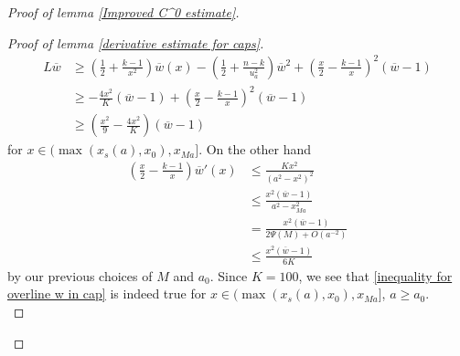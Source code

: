 \documentclass[pdflatex,sn-mathphys-num]{sn-jnl}
\begin{document}
\begin{proof}[Proof of lemma \ref{Improved C^0 estimate}]
\begin{proof}[Proof of lemma \ref{derivative estimate for caps}]
\begin{align*}
    L\overline{w} &\geq (\frac{1}{2} + \frac{k-1}{x^2})\overline{w}(x) - (\frac{1}{2} + \frac{n-k}{u_a^2})\overline{w}^2 + (\frac{x}{2} - \frac{k-1}{x})^2(\overline{w}-1)\\ &\geq -\frac{4x^2}{K}(\overline{w}-1) + (\frac{x}{2} - \frac{k-1}{x})^2(\overline{w} - 1) \\ & \geq (\frac{x^2}{9} - \frac{4x^2}{K})(\overline{w} - 1)
\end{align*}
for $x \in (\max(x_{s}(a), x_0), x_{Ma}]$. On the other hand
\begin{align*}
     (\frac{x}{2} - \frac{k-1}{x})\overline{w}'(x) & \leq \frac{Kx^2}{(a^2 - x^2)^2} \\ & \leq \frac{x^2(\overline{w}-1)}{a^2 - x_{Ma}^2}\\&  = \frac{x^2(\overline{w}-1)}{2\Psi(M)+ O(a^{-2})} \\ & \leq \frac{x^2(\overline{w}-1)}{6K }
\end{align*}
    by our previous choices of $M$ and $a_0$. Since $K = 100$, we see that 
 \eqref{inequality for overline w in cap} is indeed true
    for $x \in (\max(x_{s}(a), x_0), x_{Ma}]$, $a \geq a_0$.\\


\end{proof}
\end{proof}
\end{document}
